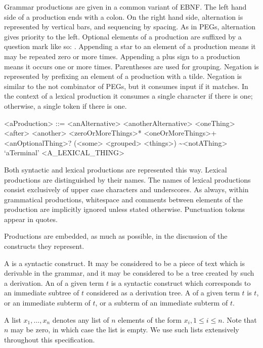 \documentclass[makeidx]{article}
\begin{document}
\LMHash{}%
Grammar productions are given in a common variant of EBNF.
The left hand side of a production ends with a colon.
On the right hand side, alternation is represented by vertical bars, and sequencing by spacing.
As in PEGs, alternation gives priority to the left.
Optional elements of a production are suffixed by a question mark like so: .
Appending a star to an element of a production means it may be repeated zero or more times.
Appending a plus sign to a production means it occurs one or more times.
Parentheses are used for grouping.
Negation is represented by prefixing an element of a production with a tilde.
Negation is similar to the not combinator of PEGs, but it consumes input if it matches.
In the context of a lexical production it consumes a single character if there is one; otherwise, a single token if there is one.


\begin{grammar}
<aProduction> ::= <anAlternative>
  \alt <anotherAlternative>
  \alt <oneThing> <after> <another>
  \alt <zeroOrMoreThings>*
  \alt <oneOrMoreThings>+
  \alt <anOptionalThing>?
  \alt (<some> <grouped> <things>)
  \alt \~{}<notAThing>
  \alt `aTerminal'
  \alt <A\_LEXICAL\_THING>
\end{grammar}

\LMHash{}%
Both syntactic and lexical productions are represented this way.
Lexical productions are distinguished by their names.
The names of lexical productions consist exclusively of upper case characters and underscores.
As always, within grammatical productions, whitespace and comments between elements of the production are implicitly ignored unless stated otherwise.
Punctuation tokens appear in quotes.

\LMHash{}%
Productions are embedded, as much as possible, in the discussion of the constructs they represent.

\LMHash{}%
A  is a syntactic construct.
It may be considered to be a piece of text which is derivable in the grammar,
and it may be considered to be a tree created by such a derivation.
An  of a given term $t$ is a syntactic construct
which corresponds to an immediate subtree of $t$ considered as a derivation tree.
A  of a given term $t$ is $t$,
or an immediate subterm of $t$,
or a subterm of an immediate subterm of $t$.

\LMHash{}%
A list $x_1, \ldots, x_n$ denotes any list of $n$ elements of the form $x_i, 1 \le i \le n$.
Note that $n$ may be zero, in which case the list is empty.
We use such lists extensively throughout this specification.
\end{document}
